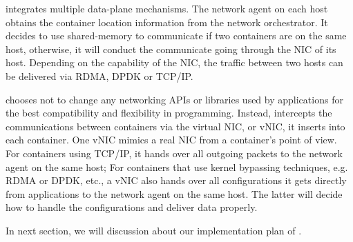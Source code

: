  \sysname integrates multiple data-plane 
mechanisms. The network agent on each host 
obtains the container location information from the network orchestrator. 
It decides to use shared-memory to communicate if two containers are on the
same host, otherwise, it will conduct the communicate going through 
the NIC of its host. Depending on the capability of the NIC, the traffic 
between two hosts can be delivered via RDMA, DPDK or TCP/IP.

 \sysname chooses not to change 
any networking APIs or libraries used by applications for the best
compatibility and flexibility in programming. Instead, \sysname intercepts
the communications between containers via the virtual NIC, or vNIC, it 
inserts into each container. One vNIC mimics a real NIC from a container's
point of view. For containers using TCP/IP, it hands over all outgoing packets
to the network agent on the same host; For containers that use kernel bypassing
techniques, e.g. RDMA or DPDK, etc., a vNIC also hands over all configurations
it gets directly from applications to the network agent on the same host. 
The latter will decide how to handle the configurations and deliver data
properly.

In next section, we will discussion about our implementation plan of \sysname.




